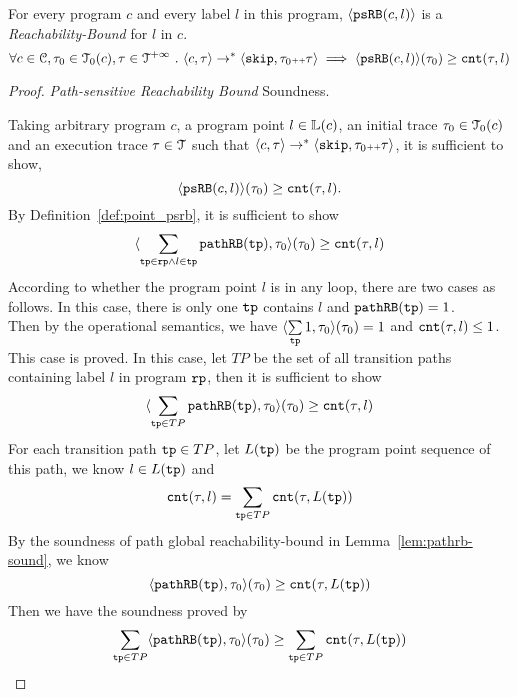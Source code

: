 \begin{theorem}
    For every program ${c}$ and every label $l$ in this program,
    $\langle \mathtt{psRB}(c, l) \rangle$ is a \emph{Reachability-Bound} for $l$ in $c$.
    \[
    \forall c \in \mathcal{C}, \mathtt{\tau}_0 \in \mathcal{T}_0(c), \mathtt{\tau} \in \mathcal{T}^{+\infty} ~.~ 
    \langle {c}, \mathtt{\tau} \rangle \to^{*} \langle \mathtt{skip}, \mathtt{\tau}_0 {\scriptscriptstyle ++} \mathtt{\tau} \rangle 
    \implies \langle \mathtt{psRB}(c, l) \rangle(\mathtt{\tau}_0) \geq \mathtt{cnt}(\mathtt{\tau}, l) 
    \]
\end{theorem}
%
\begin{proof} \emph{Path-sensitive Reachability Bound} Soundness.

    Taking arbitrary program $c$, a program point $l \in \mathbb{L}(c)$, an initial trace $\mathtt{\tau}_0 \in \mathcal{T}_0(c)$ and an execution trace $\mathtt{\tau} \in \mathcal{T}$
    such that $\langle {c}, \mathtt{\tau} \rangle \to^{*} \langle \mathtt{skip}, \mathtt{\tau}_0 {\scriptscriptstyle ++} \mathtt{\tau} \rangle$,
    it is sufficient to show,
    \[
    \langle \mathtt{psRB}(c, l) \rangle(\mathtt{\tau}_0) \geq \mathtt{cnt}(\mathtt{\tau}, l) .
    \]
    By Definition~\ref{def:point_psrb}, it is sufficient to show 
    \[
    \langle \sum\limits_{\mathtt{tp} \in \mathtt{rp} \land  l \in \mathtt{tp}} \mathtt{pathRB}(\mathtt{tp}), \mathtt{\tau}_0 \rangle(\mathtt{\tau}_0)  \geq  \mathtt{cnt}(\mathtt{\tau}, l)
    \]
    According to whether the program point $l$ is in any loop, there are two cases as follows.
    In this case, there is only one $\mathtt{tp}$ contains $l$ and $\mathtt{pathRB}(\mathtt{tp}) = 1$.
    \\
    Then by the operational semantics, we have $\langle \sum\limits_{\mathtt{tp}} 1, \mathtt{\tau}_0 \rangle(\mathtt{\tau}_0) =  1$ and $ \mathtt{cnt}(\mathtt{\tau}, l) \leq 1$.
    \\
    This case is proved.
    In this case, let $TP$ be the set of all transition paths containing 
    label $l$ in program $\mathtt{rp}$, then it is sufficient to show 
    \[
        \langle \sum\limits_{\mathtt{tp} \in TP} \mathtt{pathRB}(\mathtt{tp}), \mathtt{\tau}_0 \rangle(\mathtt{\tau}_0)  \geq  \mathtt{cnt}(\mathtt{\tau}, l)
    \]
    For each transition path $\mathtt{tp} \in TP$, let $L(\mathtt{tp})$ be the program point sequence of this path, we know $l \in L(\mathtt{tp})$
    and 
    \[
        \mathtt{cnt}(\mathtt{\tau}, l) = \sum\limits_{\mathtt{tp} \in TP} \mathtt{cnt}(\mathtt{\tau}, L(\mathtt{tp}))
    \]
    By the soundness of path global reachability-bound in Lemma~\ref{lem:pathrb-sound}, we know
    \[
        \langle \mathtt{pathRB}(\mathtt{tp}), \mathtt{\tau}_0 \rangle(\mathtt{\tau}_0)  \geq  \mathtt{cnt}(\mathtt{\tau}, L(\mathtt{tp}))
    \]
    Then we have the soundness proved by
    \[
        \sum\limits_{\mathtt{tp} \in TP} \langle \mathtt{pathRB}(\mathtt{tp}), \mathtt{\tau}_0 \rangle(\mathtt{\tau}_0)  \geq \sum\limits_{\mathtt{tp} \in TP}  \mathtt{cnt}(\mathtt{\tau}, L(\mathtt{tp}))
    \]
\end{proof}
  
